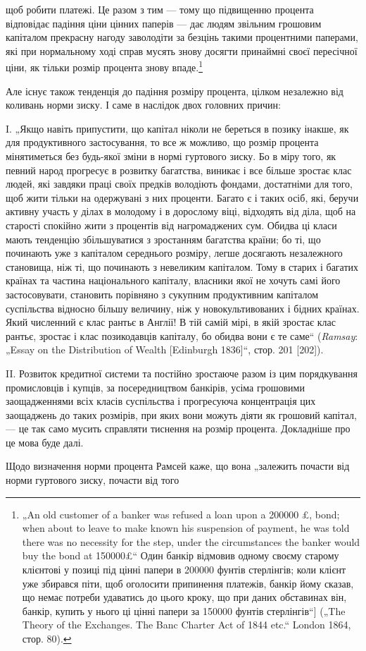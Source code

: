 \parcont{}  %
щоб робити платежі. Це разом з тим — тому що підвищенню процента
відповідає падіння ціни цінних паперів — дає людям звільним
грошовим капіталом прекрасну нагоду заволодіти за безцінь
такими процентними паперами, які при нормальному ході справ
мусять знову досягти принаймні своєї пересічної ціни, як тільки
розмір процента знову впаде.\footnote{
„An old customer of a banker was refused a loan upon a \num{200000} £, bond;
when about to leave to make known his suspension of payment, he was told
there was no necessity for the step, under the circumstances the banker would buy
the bond at \num{150000}£“ Один банкір відмовив одному своєму старому клієнтові
у позиці під цінні папери в \num{200000} фунтів стерлінгів; коли клієнт уже збирався
піти, щоб оголосити припинення платежів, банкір йому сказав, що немає потреби
удаватись до цього кроку, що при даних обставинах він, банкір, купить
у нього ці цінні папери за \num{150000} фунтів стерлінгів“] („The Theory of the Exchanges.
The Banc Charter Act of 1844 etc.“ London 1864, стор. 80).
}

Але існує також тенденція до падіння розміру процента, цілком
незалежно від коливань норми зиску. І саме в наслідок
двох головних причин:

I. „Якщо навіть припустити, що капітал ніколи не береться
в позику інакше, як для продуктивного застосування, то все ж
можливо, що розмір процента мінятиметься без будь-якої зміни
в нормі гуртового зиску. Бо в міру того, як певний народ прогресує
в розвитку багатства, виникає і все більше зростає клас
людей, які завдяки праці своїх предків володіють фондами, достатніми
для того, щоб жити тільки на одержувані з них проценти.
Багато є і таких осіб, які, беручи активну участь у ділах в молодому
і в дорослому віці, відходять від діла, щоб на старості
спокійно жити з процентів від нагромаджених сум. Обидва ці
класи мають тенденцію збільшуватися з зростанням багатства
країни; бо ті, що починають уже з капіталом середнього розміру,
легше досягають незалежного становища, ніж ті, що починають
з невеликим капіталом. Тому в старих і багатих країнах
та частина національного капіталу, власники якої не хочуть самі
його застосовувати, становить порівняно з сукупним продуктивним
капіталом суспільства відносно більшу величину, ніж
у новокультивованих і бідних країнах. Який численний є клас
рантьє в Англії! В тій самій мірі, в якій зростає клас рантьє,
зростає і клас позикодавців капіталу, бо обидва вони є те саме“
(\emph{Ramsay}: „Essay on the Distribution of Wealth [Edinburgh 1836]“,
стор. 201 [202]).

II. Розвиток кредитної системи та постійно зростаюче разом
із цим порядкування промисловців і купців, за посередництвом
банкірів, усіма грошовими заощадженнями всіх класів суспільства
і прогресуюча концентрація цих заощаджень до таких розмірів,
при яких вони можуть діяти як грошовий капітал, — це
так само мусить справляти тиснення на розмір процента.
Докладніше про це мова буде далі.

Щодо визначення норми процента Рамсей каже, що вона „залежить
почасти від норми гуртового зиску, почасти від того
\parbreak{}  %
